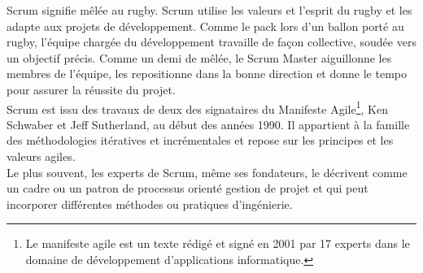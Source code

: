 \documentclass{article}
\begin{document}
\guillemotleft Scrum signifie mêlée au rugby. Scrum utilise les valeurs et l’esprit du rugby et les adapte aux projets de développement. Comme le pack lors d’un ballon porté au rugby, l’équipe chargée du développement travaille de façon collective, soudée vers un objectif précis. Comme un demi de mêlée, le Scrum Master aiguillonne les membres de l’équipe, les repositionne dans la bonne direction et donne le tempo pour assurer la réussite du projet. \guillemotright [1]\\\label{sec:hello}
Scrum est issu des travaux de deux des signataires du Manifeste Agile\footnote{Le manifeste agile est un texte rédigé et signé en 2001 par 17 experts dans le domaine de développement d’applications informatique.}, Ken Schwaber et Jeff Sutherland, au début des années 1990. Il appartient à la famille des méthodologies itératives et incrémentales et repose sur les principes et les valeurs agiles.\\
Le plus souvent, les experts de Scrum, même ses fondateurs, le décrivent comme un cadre ou un patron de processus orienté gestion de projet et qui peut incorporer différentes méthodes ou pratiques d’ingénierie.
\end{document}
